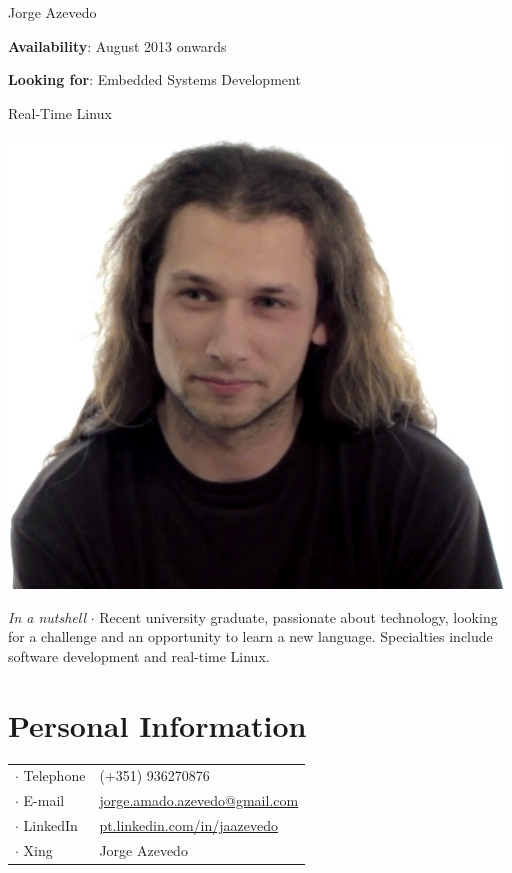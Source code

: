 



\topSection
{
	{\Huge Jorge Azevedo}

	\vspace{1.5mm}
	\vspace*{10mm}

	\textbf{Availability}: August 2013 onwards

	\textbf{Looking for}: Embedded Systems Development

	\hspace{66pt}Real-Time Linux
} {
	\includegraphics[width=0.985\textwidth]{img/photo}
}

\emph{In a nutshell} $\cdot$  Recent university graduate, passionate about
technology, looking for a challenge and an opportunity to learn a new language.
Specialties include software development and real-time Linux.

\section*{Personal Information}

{
\begin{tabular}[t]{@{}l l}
	$\cdot$  Telephone & (+351) 936270876 \\
	$\cdot$  E-mail & \href{mailto:jorge.amado.azevedo@gmail.com}{jorge.amado.azevedo@gmail.com} \\
	$\cdot$  LinkedIn & \href{http://pt.linkedin.com/in/jaazevedo}{pt.linkedin.com/in/jaazevedo}\\
	$\cdot$  Xing & Jorge Azevedo\\
\end{tabular}
}

